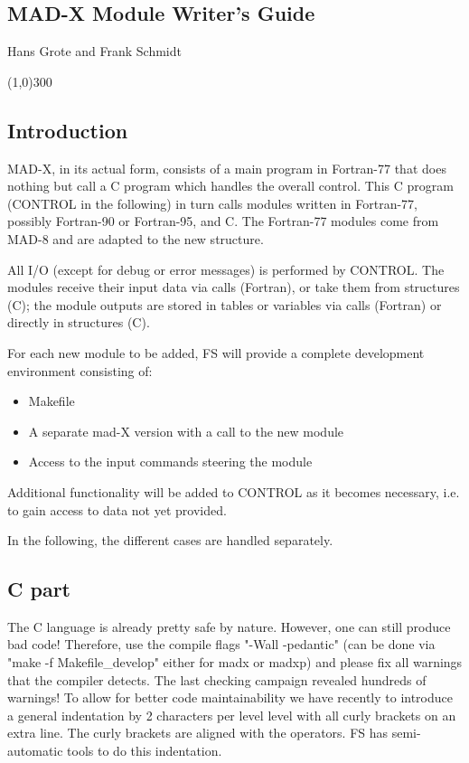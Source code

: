 



\begin{center}

\subsection{MAD-X Module Writer's Guide}
Hans Grote and Frank Schmidt 
\end{center}


\line(1,0){300}


\subsection{Introduction} MAD-X, in its actual form, consists of a main
program in Fortran-77 that  does nothing but call a C program which
handles the overall control.  This C program (CONTROL in the following)
in turn calls modules written in Fortran-77, possibly  Fortran-90 or
Fortran-95, and C. The Fortran-77 modules come from MAD-8 and are
adapted to the new structure.  

All I/O (except for debug or error messages) is performed by
CONTROL. The modules receive their input data via calls (Fortran), or
take them from structures (C); the module outputs are stored in tables
or variables via calls (Fortran) or directly in structures (C).   

For each new module to be added, FS will provide a complete development
environment consisting of:  
\begin{itemize}
  \item Makefile
  \item A separate mad-X version with a call to the new module
  \item Access to the input commands steering the module
\end{itemize} 

Additional functionality will be added to CONTROL as it becomes
necessary, i.e. to gain access to data not yet provided.   

In the following, the different cases are handled separately. 

\subsection{C part} 
The C language is already pretty safe by nature. However, one can still
produce bad code! Therefore, use the compile flags "-Wall -pedantic"
(can be done via "make -f Makefile\_develop" either for madx or madxp)
and please fix all warnings that the compiler detects. The last checking
campaign revealed hundreds of warnings! To allow for better code
maintainability we have recently to introduce a general indentation by 2
characters per level level with all curly brackets on an extra line. The
curly brackets are aligned with the operators. FS has semi-automatic
tools to do this indentation.  

